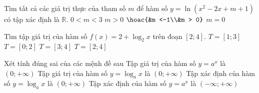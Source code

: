 \begin{ex}%
	Tìm tất cả các giá trị thực của tham số $m$ để hàm số $y=\ln\left(x^2-2x+m+1\right)$ có tập xác định  là $\mathbb{R}$.
	 \choice
		{$0 < m  < 3$}
		{\True $m > 0$} 
		{$\hoac{&m <-1\\&m  > 0}$}
		{$m=0$} 
\end{ex}

\begin{ex}%
	Tìm tập giá trị của hàm số $f(x)=2+\log_2x$  trên đoạn $\left[2;4\right]$.
	 \choice
		 {$T=\left[1;3\right]$}
		{$T=\left[0;2\right]$} 
		 {\True $T=\left[3;4\right]$}
		{$T=\left[2;4\right]$} 
\end{ex}



\begin{ex}%
 Xét tính  đúng sai của các mệnh đề sau
 \choiceTF 
  {\True  Tập giá trị của hàm số $y=a^x$ là $(0;+\infty)$}
  {Tập giá trị của  hàm số $y=\log_a x$ là $(0;+\infty)$}
  {\True Tập xác định của hàm số $y=\log_a  x$ là $(0;+\infty)$}
  {\True Tập xác định của hàm  số $y=a^x$ là $(-\infty;+\infty)$}
\end{ex}

